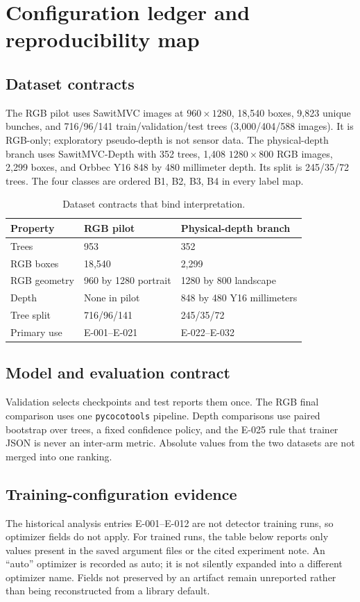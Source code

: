 \documentclass[preprint,12pt]{elsarticle}
\begin{document}
\section{Configuration ledger and reproducibility map}
\label{sec:config}
\subsection{Dataset contracts}
The RGB pilot uses SawitMVC images at \(960\mathbin{\times}1280\), 18,540
boxes, 9,823 unique bunches, and 716/96/141 train/validation/test trees
(3,000/404/588 images). It is RGB-only; exploratory pseudo-depth is not
sensor data. The physical-depth branch uses SawitMVC-Depth with 352 trees,
1,408 \(1280\mathbin{\times}800\) RGB images, 2,299 boxes, and Orbbec Y16
848 by 480 millimeter depth. Its split is 245/35/72 trees. The four classes
are ordered B1, B2, B3, B4 in every label map.

\begin{table}[H]
\centering
\caption{Dataset contracts that bind interpretation.}
\label{tab:datasets}
\begin{tabular}{L{0.25\columnwidth}L{0.32\columnwidth}L{0.32\columnwidth}}
\toprule
Property & RGB pilot & Physical-depth branch\\
\midrule
Trees & 953 & 352\\
RGB boxes & 18,540 & 2,299\\
RGB geometry & 960 by 1280 portrait & 1280 by 800 landscape\\
Depth & None in pilot & 848 by 480 Y16 millimeters\\
Tree split & 716/96/141 & 245/35/72\\
Primary use & E-001--E-021 & E-022--E-032\\
\bottomrule
\end{tabular}
\end{table}

\subsection{Model and evaluation contract}
Validation selects checkpoints and test reports them once. The RGB final
comparison uses one \texttt{pycocotools} pipeline. Depth comparisons use
paired bootstrap over trees, a fixed confidence policy, and the E-025 rule
that trainer JSON is never an inter-arm metric. Absolute values from the two
datasets are not merged into one ranking.

\subsection{Training-configuration evidence}
The historical analysis entries E-001--E-012 are not detector training runs,
so optimizer fields do not apply. For trained runs, the table below reports
only values present in the saved argument files or the cited experiment note.
An ``auto'' optimizer is recorded as auto; it is not silently expanded into a
different optimizer name. Fields not preserved by an artifact remain
unreported rather than being reconstructed from a library default.
\end{document}
